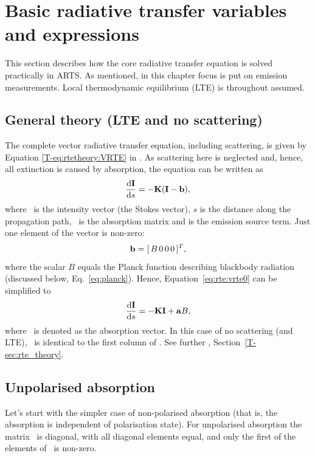 \section{Basic radiative transfer variables and expressions}
\label{sec:fm_defs:rte}

This section describes how the core radiative transfer equation is solved
practically in ARTS. As mentioned, in this chapter focus is put on emission
measurements. Local thermodynamic equilibrium (LTE) is throughout assumed.

\subsection{General theory (LTE and no scattering)}

The complete vector radiative transfer equation, including scattering, is given
by Equation \ref{T-eq:rtetheory:VRTE} in \theory. As scattering here is
neglected and, hence, all extinction is caused by absorption, the equation can
be written as
\begin{equation}
  \label{eq:rte:vrte0}
  \frac {\mathrm{d}{\bf I}}{\mathrm{d} s} = -{\bf K}({\bf I}-\mathbf{b}),
\end{equation}
where \StoVec\ is the intensity vector (the Stokes vector), $s$ is the distance
along the propagation path, \ExtMat\ is the absorption matrix and  is
the emission source term. Just one element of the vector  is non-zero:
\begin{equation}
  \label{eq:rte:bvec}
  \mathbf{b} = [\,B\,0\,0\,0\,]^T,
\end{equation}
where the scalar $B$ equals the Planck function describing blackbody radiation
(discussed below, Eq.~\ref{eq:planck}).
Hence, Equation~\ref{eq:rte:vrte0} can be simplified to
\begin{equation}
  \label{eq:rte:vrte}
  \frac {\mathrm{d}{\bf I}}{\mathrm{d} s} = -{\bf K}{\bf I} + {\bf a} B,
\end{equation}
where \AbsVec\ is denoted as the absorption vector. In this case of no
scattering (and LTE), \AbsVec\ is identical to the first column of \ExtMat.
See further \theory, Section~\ref{T-sec:rte_theory}. 


\subsection{Unpolarised absorption}

Let's start with the simpler case of non-polarised absorption (that is, the
absorption is independent of polarisation state). For unpolarised absorption the
matrix \ExtMat\ is diagonal, with all diagonal elements equal, and only the
first of the elements of \AbsVec\ is non-zero.

